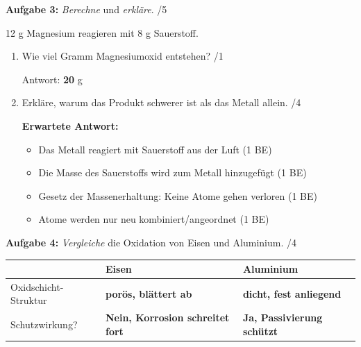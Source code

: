 \documentclass[11pt, a4paper]{article}
\newcommand{\punkte}[1]{\hfill\textcolor{mittelgrau}{/#1}}
\newcommand{\lsg}[1]{\textcolor{loesung}{\textbf{#1}}}
\begin{document}
\vspace{0.5em}


\textbf{Aufgabe 3:} \textit{Berechne} und \textit{erkläre}. \punkte{5}

12 g Magnesium reagieren mit 8 g Sauerstoff.

\begin{enumerate}[label=\alph*), leftmargin=2em, itemsep=0.3em]
    \item Wie viel Gramm Magnesiumoxid entstehen? \punkte{1}

    \vspace{0.3em}
    Antwort: \lsg{20} g \quad {\small\textcolor{loesung}{(12 g + 8 g = 20 g)}}

    \item Erkläre, warum das Produkt schwerer ist als das Metall allein. \punkte{4}

    \vspace{0.3em}
    \textcolor{loesung}{%
    \textbf{Erwartete Antwort:}
    \begin{itemize}[leftmargin=1.5em, itemsep=1pt]
        \item Das Metall reagiert mit Sauerstoff aus der Luft (1 BE)
        \item Die Masse des Sauerstoffs wird zum Metall hinzugefügt (1 BE)
        \item Gesetz der Massenerhaltung: Keine Atome gehen verloren (1 BE)
        \item Atome werden nur neu kombiniert/angeordnet (1 BE)
    \end{itemize}
    }
\end{enumerate}

\vspace{0.5em}


\textbf{Aufgabe 4:} \textit{Vergleiche} die Oxidation von Eisen und Aluminium. \punkte{4}

\begin{tabular}{|p{3cm}|p{5.5cm}|p{5.5cm}|}
\hline
& \textbf{Eisen} & \textbf{Aluminium} \\
\hline
Oxidschicht-Struktur & \lsg{porös, blättert ab} & \lsg{dicht, fest anliegend} \\[0.8em]
\hline
Schutzwirkung? & \lsg{Nein, Korrosion schreitet fort} & \lsg{Ja, Passivierung schützt} \\[0.8em]
\hline
\end{tabular}
\end{document}
